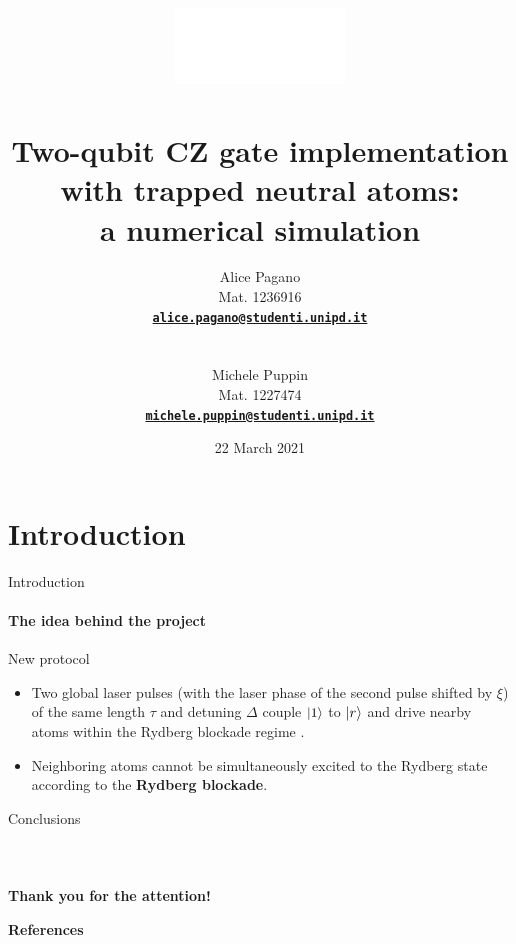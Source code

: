 \documentclass[8pt]{beamer}
\title[Two-qubit CZ gate with trapped neutral atoms]{
	\includegraphics[height=2cm]{images/logo/unipd_logo_white.png}\\
	~\\
	\textbf{ \Large
		Two-qubit CZ gate implementation with trapped neutral atoms: \\ a numerical simulation
	}
}
\institute{Quantum Information and Computing \\ (a.y. 2020/21) }
\author[Alice Pagano - Michele Puppin]{\small%
    \parbox{2.5cm}{Alice Pagano}\parbox{2.5cm}{Mat. 1236916} \parbox{3.8cm}{\bf\href{mailto:alice.pagano@studenti.unipd.it}{\texttt{\color{linkcolor}alice.pagano@studenti.unipd.it}}} 
    \\ \vspace{0.1cm}
    \parbox{2.5cm}{Michele Puppin}\parbox{2.5cm}{Mat. 1227474} \parbox{3.8cm}{\bf\href{mailto:michele.puppin@studenti.unipd.it}{\texttt{\color{linkcolor}michele.puppin@studenti.unipd.it}}}}
\date{22 March 2021}
\begin{document}
	\begin{frame}[plain]
	    \titlepage
	\end{frame} 

    \setcounter{framenumber}{0}


	\section{Introduction}
	
	\begin{frame}[c]{Introduction}
	\framesubtitle{The idea behind the project}

	    \begin{block}{New protocol}
            \begin{itemize}
            \item Two global laser pulses (with the laser phase of the second pulse shifted by $\xi$) of the same length $\tau$ and detuning $\Delta$ couple $\ket{1}$ to $\ket{r}$ and drive nearby atoms within the Rydberg blockade regime \cite{PhysRevLett.123.170503}.
            \item Neighboring atoms cannot be simultaneously excited to the Rydberg state according to the \textbf{Rydberg blockade}.
            \end{itemize}
        \end{block}
	\end{frame}


 	\begin{frame}{Conclusions}
	\framesubtitle{~}  

        \begin{center}
            \begin{minipage}[c]{0.55\textwidth}
                \begin{tcolorbox}[colframe=mydarkblue,colback=myblue,coltext=black]
                    \begin{center}
                        \Huge \textbf{Thank you for the attention!}
                    \end{center}
                \end{tcolorbox}
            \end{minipage}
        \end{center}
        
	\color{myred}\textbf{References}
	
	{}
    
	\end{frame}	
	
	
	
 
\end{document}
